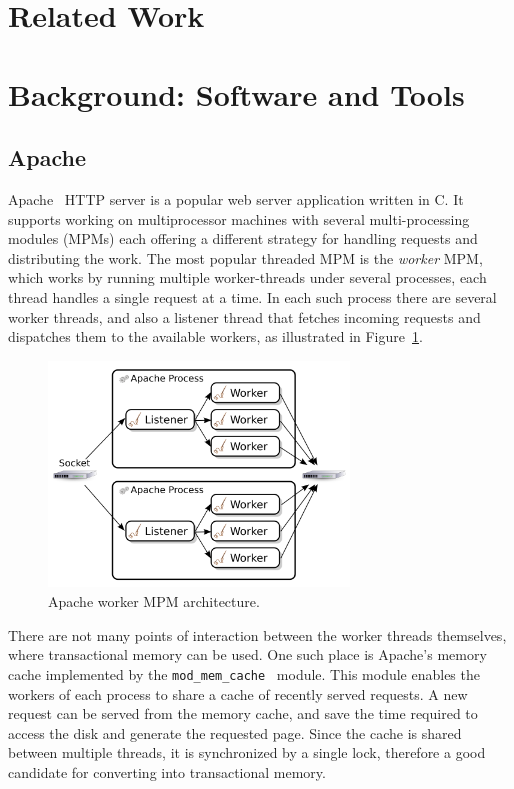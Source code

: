 \documentclass[preprint,natbib,11pt]{sigplanconf}
\begin{document}
\section{Related Work}
\section{Background: Software and Tools}\label{sec:background}
\subsection{Apache}\label{sec:apache}
Apache~\cite{apache} HTTP server is a popular web server application written in
C. It supports working on multiprocessor machines with several multi-processing
modules (MPMs) each offering a different strategy for handling requests and
distributing the work. The most popular threaded MPM is the \emph{worker} MPM,
which works by running multiple worker-threads under several processes, each
thread handles a single request at a time. In each such process there are
several worker threads, and also a listener thread that fetches incoming
requests and dispatches them to the available workers, as illustrated in
Figure~\ref{fig:apache-worker-MPM}.

\begin{figure}
 \begin{center}
  \includegraphics[width=8cm]{Apache-Worker-MPM.png}
 \end{center}
 \caption{Apache worker MPM architecture.}
 \label{fig:apache-worker-MPM}
\end{figure}

There are not many points of interaction between the worker threads themselves,
where transactional memory can be used. One such place is Apache's memory cache
implemented by the {\tt mod\_mem\_cache}~\cite{apache:mod_mem_cache} module. This
module enables the workers of each process to share a cache of recently served
requests. A new request can be served from the memory cache, and save the time
required to access the disk and generate the requested page. Since the cache is
shared between multiple threads, it is synchronized by a single lock, therefore
a good candidate for converting into transactional memory.
\end{document}
